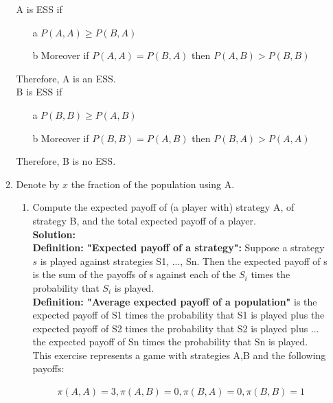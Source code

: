 \documentclass[a4paper]{article}
\begin{document}
\begin{enumerate}
\begin{enumerate}
		A is ESS if
		
		\begin{enumerate}
		    \item[a] $P(A,A) \geq P(B,A)$
		    \item[b] Moreover if $P(A,A) = P(B,A)$ then $P(A,B) > P(B,B)$
		\end{enumerate}
		
		Therefore, A is an ESS.\\
		
		B is ESS if
		
		\begin{enumerate}
		    \item[a] $P(B,B) \geq P(A,B)$
		    \item[b] Moreover if $P(B,B) = P(A,B)$ then $P(B,A) > P(A,A)$
		\end{enumerate}
		
		Therefore, B is no ESS.\\
		
		
		
		
		\item Denote by $x$ the fraction of the population using A.
			\begin{enumerate}
				\item Compute the expected payoff of (a player with) strategy A, of strategy B, and the total expected payoff of a player.\\
				\textbf{Solution:}\\
				
				\textbf{Definition: "Expected payoff of a strategy":} Suppose a strategy $s$ is played against strategies S1, ..., Sn. Then the expected payoff of s is the sum of the payoffs of s against each of the $S_i$ times the probability that $S_i$ is played.\\
				
                \textbf{Definition: "Average expected payoff of a population"} is the expected payoff of S1 times the probability that S1 is played plus the expected payoff of S2 times the probability that S2 is played plus ... the expected payoff of Sn times the probability that Sn is played.\\
				
				
				
								This exercise represents a game with strategies A,B and the following payoffs:
				
												\begin{align*}
				    \pi(A,A) = 3, \pi(A,B) = 0, \pi(B,A) = 0, \pi(B,B) = 1
				\end{align*}
				\vspace{1em}
				

\end{enumerate}
\end{enumerate}
\end{enumerate}
\end{document}
